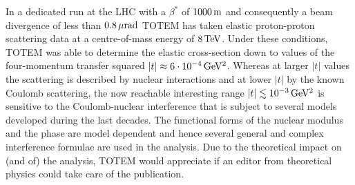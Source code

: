 \documentclass[11pt,twoside,a4paper]{article}
\def\un#1{\,{\rm #1}}
\begin{document}
In a dedicated run at the LHC with a $\beta^*$ of $1000\un{m}$ and consequently a beam divergence of less than $0.8\un{\mu rad}$ TOTEM has taken elastic proton-proton scattering data at a centre-of-mass energy of $8\un{TeV}$. Under these conditions, TOTEM was able to determine the elastic cross-section down to values of the four-momentum transfer squared $|t|\approx 6\cdot 10^{-4}\un{GeV^2}$. Whereas at larger $|t|$ values the scattering is described by nuclear interactions and at lower $|t|$ by the known Coulomb scattering, the now reachable interesting range $|t| \lesssim 10^{-3}\un{GeV^2}$ is sensitive to the Coulomb-nuclear interference that is subject to several models developed during the last decades. The functional forms of the nuclear modulus and the phase are model dependent and hence several general and complex interference formulae are used in the analysis. 
Due to the theoretical impact on (and of) the analysis, TOTEM would appreciate if an editor from theoretical physics could take care of the publication.
\end{document}
